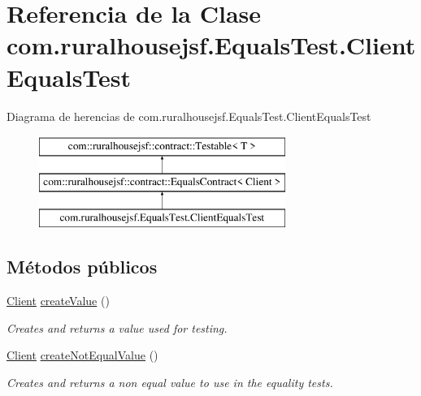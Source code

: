 \hypertarget{classcom_1_1ruralhousejsf_1_1_equals_test_1_1_client_equals_test}{}\section{Referencia de la Clase com.\+ruralhousejsf.\+Equals\+Test.\+Client\+Equals\+Test}
\label{classcom_1_1ruralhousejsf_1_1_equals_test_1_1_client_equals_test}
Diagrama de herencias de com.\+ruralhousejsf.\+Equals\+Test.\+Client\+Equals\+Test\begin{figure}[H]
\begin{center}
\leavevmode
\includegraphics[height=3.000000cm]{d1/db7/classcom_1_1ruralhousejsf_1_1_equals_test_1_1_client_equals_test}
\end{center}
\end{figure}
\subsection*{Métodos públicos}
\begin{DoxyCompactItemize}
\item 
\mbox{\hyperlink{classcom_1_1ruralhousejsf_1_1domain_1_1_client}{Client}} \mbox{\hyperlink{classcom_1_1ruralhousejsf_1_1_equals_test_1_1_client_equals_test_aa74f54ea042862db1a5499d31ec75539}{create\+Value}} ()
\begin{DoxyCompactList}\small\item\em Creates and returns a value used for testing. \end{DoxyCompactList}\item 
\mbox{\hyperlink{classcom_1_1ruralhousejsf_1_1domain_1_1_client}{Client}} \mbox{\hyperlink{classcom_1_1ruralhousejsf_1_1_equals_test_1_1_client_equals_test_a25218bb97f8e3d88b9dd7e13afd0a6ed}{create\+Not\+Equal\+Value}} ()
\begin{DoxyCompactList}\small\item\em Creates and returns a non equal value to use in the equality tests. \end{DoxyCompactList}\end{DoxyCompactItemize}


